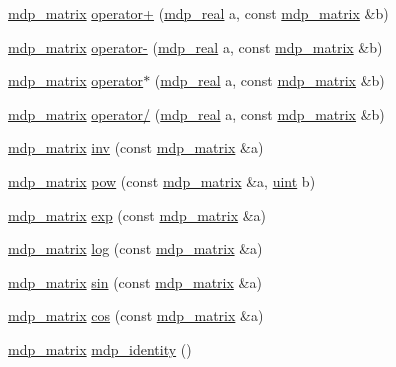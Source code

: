\begin{DoxyCompactItemize}
\hyperlink{classmdp__matrix}{mdp\_\-matrix} \hyperlink{classmdp__matrix_ace32cb8f1638c0ff6917045e2d10f467}{operator+} (\hyperlink{mdp__global__vars_8h_a049e4c1d4e74d644878a42f9909463e4}{mdp\_\-real} a, const \hyperlink{classmdp__matrix}{mdp\_\-matrix} \&b)
\item 
\hyperlink{classmdp__matrix}{mdp\_\-matrix} \hyperlink{classmdp__matrix_a0034bcdf68e3b07c30b406e046401937}{operator-\/} (\hyperlink{mdp__global__vars_8h_a049e4c1d4e74d644878a42f9909463e4}{mdp\_\-real} a, const \hyperlink{classmdp__matrix}{mdp\_\-matrix} \&b)
\item 
\hyperlink{classmdp__matrix}{mdp\_\-matrix} \hyperlink{classmdp__matrix_a0518710232891fb4bded31598cc6cd5e}{operator$\ast$} (\hyperlink{mdp__global__vars_8h_a049e4c1d4e74d644878a42f9909463e4}{mdp\_\-real} a, const \hyperlink{classmdp__matrix}{mdp\_\-matrix} \&b)
\item 
\hyperlink{classmdp__matrix}{mdp\_\-matrix} \hyperlink{classmdp__matrix_a78e9bd78d0aa894b75fa5e92e195d327}{operator/} (\hyperlink{mdp__global__vars_8h_a049e4c1d4e74d644878a42f9909463e4}{mdp\_\-real} a, const \hyperlink{classmdp__matrix}{mdp\_\-matrix} \&b)
\item 
\hyperlink{classmdp__matrix}{mdp\_\-matrix} \hyperlink{classmdp__matrix_a01d58a336c980c060907abb7141eedee}{inv} (const \hyperlink{classmdp__matrix}{mdp\_\-matrix} \&a)
\item 
\hyperlink{classmdp__matrix}{mdp\_\-matrix} \hyperlink{classmdp__matrix_aed471057fee36406313f0d6db8469981}{pow} (const \hyperlink{classmdp__matrix}{mdp\_\-matrix} \&a, \hyperlink{mdp__global__vars_8h_a91ad9478d81a7aaf2593e8d9c3d06a14}{uint} b)
\item 
\hyperlink{classmdp__matrix}{mdp\_\-matrix} \hyperlink{classmdp__matrix_af3a316cad42444877d4ab7e2a72c37c7}{exp} (const \hyperlink{classmdp__matrix}{mdp\_\-matrix} \&a)
\item 
\hyperlink{classmdp__matrix}{mdp\_\-matrix} \hyperlink{classmdp__matrix_a173074a62f14de569920183069485652}{log} (const \hyperlink{classmdp__matrix}{mdp\_\-matrix} \&a)
\item 
\hyperlink{classmdp__matrix}{mdp\_\-matrix} \hyperlink{classmdp__matrix_ae7a9b12e9cedc3d6f274c9fe9eb44332}{sin} (const \hyperlink{classmdp__matrix}{mdp\_\-matrix} \&a)
\item 
\hyperlink{classmdp__matrix}{mdp\_\-matrix} \hyperlink{classmdp__matrix_aba32e6f9246f9ebad76f6b5c4e696cea}{cos} (const \hyperlink{classmdp__matrix}{mdp\_\-matrix} \&a)
\item 
\hyperlink{classmdp__matrix}{mdp\_\-matrix} \hyperlink{classmdp__matrix_a6b60fadcf53631a262b63ffb5f0f56ea}{mdp\_\-identity} ()

\end{DoxyCompactItemize}
